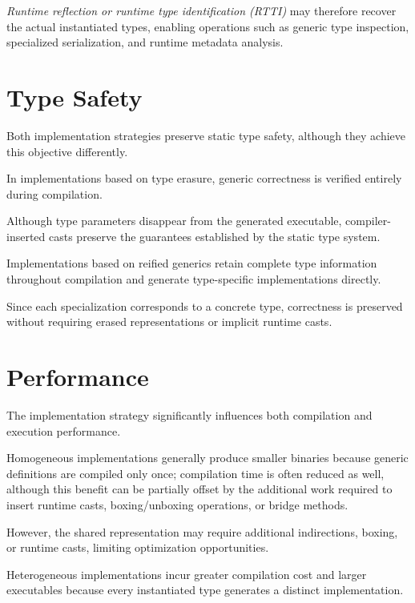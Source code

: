 \documentclass[11pt]{report}
\begin{document}
\emph{Runtime reflection or runtime type identification (RTTI)} may therefore
recover the actual instantiated types, enabling operations such as generic type
inspection, specialized serialization, and runtime metadata analysis.



\label{Introduction: Type Safety}
\section{Type Safety}


Both implementation strategies preserve static type safety, although they
achieve this objective differently.


In implementations based on type erasure, generic correctness is verified
entirely during compilation.

Although type parameters disappear from the generated executable,
compiler-inserted casts preserve the guarantees established by the static type
system.


Implementations based on reified generics retain complete type information
throughout compilation and generate type-specific implementations directly.

Since each specialization corresponds to a concrete type, correctness is
preserved without requiring erased representations or implicit runtime casts.




\section{Performance}
\label{Introduction:Performance}

The implementation strategy significantly influences both compilation and
execution performance.

Homogeneous implementations generally produce smaller binaries because generic definitions
are compiled only once; compilation time is often reduced as well, although this benefit can
be partially offset by the additional work required to insert runtime casts, boxing/unboxing
operations, or bridge methods.

However, the shared representation may require additional indirections,
boxing, or runtime casts, limiting optimization opportunities.


Heterogeneous implementations incur greater compilation cost and larger
executables because every instantiated type generates a distinct implementation.
\end{document}
